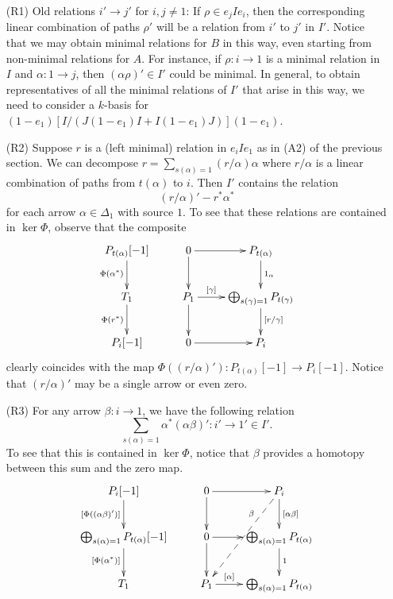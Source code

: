 \documentclass{amsart}
\begin{document}
\begin{itemize}
\item[(R1)] Old relations $i' \rightarrow j'$ for $i, j \neq 1$:  If $\rho \in e_j Ie_i$, then the corresponding linear combination of paths $\rho'$ will be a relation from $i'$ to $j'$ in $I'$.  Notice that we may obtain minimal relations for $B$ in this way, even starting from non-minimal relations for $A$.  For instance, if $\rho : i \rightarrow 1$ is a minimal relation in $I$ and $\alpha : 1 \rightarrow j$, then $(\alpha \rho)' \in I'$ could be minimal.  In general, to obtain representatives of all the minimal relations of $I'$ that arise in this way, we need to consider a $k$-basis for $(1-e_1)[I / (J(1-e_1)I + I(1-e_1)J)](1-e_1)$.

\vspace{2mm}
\item[(R2)] Suppose $r$ is a (left minimal) relation in $e_iIe_1$ as in (A2) of the previous section.  We can decompose $r = \sum_{s(\alpha)=1}(r/\alpha)\alpha$ where $r/\alpha$ is a linear combination of paths from $t(\alpha)$ to $i$.  Then $I'$ contains the relation $$(r/\alpha)' - r^*\alpha^*$$ for each arrow $\alpha \in \Delta_1$ with source $1$.  To see that these relations are contained in $\ker \Phi$, observe that the composite
$$\xymatrix{P_{t(\alpha)}[-1] \ar[d]_{\Phi(\alpha^*)} & 0 \ar[r] \ar[d] & P_{t(\alpha)} \ar[d]^{1_{\alpha}} \\ T_1 \ar[d]_{\Phi(r^*)} & P_1 \ar[r]^-{[\gamma]} \ar[d] & \bigoplus_{s(\gamma)=1} P_{t(\gamma)} \ar[d]^{[r/\gamma]} \\ P_i[-1] & 0 \ar[r] & P_i}$$
clearly coincides with the map $\Phi((r/\alpha)') : P_{t(\alpha)}[-1] \rightarrow P_i[-1]$.  Notice that $(r/\alpha)'$ may be a single arrow or even zero.

\vspace{2mm}
\item[(R3)] For any arrow $\beta : i \rightarrow 1$, we have the following relation
$$\sum_{s(\alpha)=1} \alpha^*(\alpha \beta)' : i' \rightarrow 1' \in I'.$$
  To see that this is contained in $\ker \Phi$, notice that $\beta$ provides a homotopy between this sum and the zero map.
$$\xymatrix{P_{i}[-1] \ar[d]_{[\Phi((\alpha \beta)')]} & 0 \ar[r] \ar[d] & P_{i} \ar[d]^{[\alpha \beta]} \ar@{-->}[ddl]_(.3){\beta} \\ \bigoplus_{s(\alpha)=1} P_{t(\alpha)}[-1] \ar[d]_{[\Phi(\alpha^*)]} & 0 \ar[r] \ar[d] & \bigoplus_{s(\alpha)=1}P_{t(\alpha)} \ar[d]^{1} \\
T_1 & P_1 \ar[r]^-{[\alpha]} & \bigoplus_{s(\alpha)=1} P_{t(\alpha)} }$$


\end{itemize}
\end{document}
